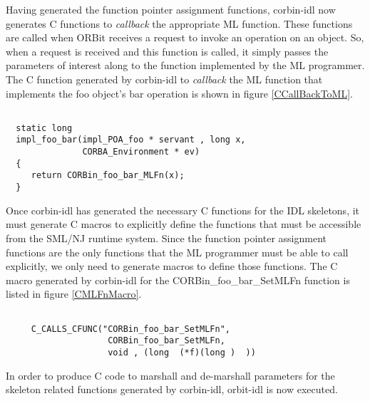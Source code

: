 Having generated the function pointer assignment functions, 
corbin-idl now generates C functions to {\em{callback}} the appropriate 
ML function.   
These functions are called when ORBit receives a request to invoke
an operation on an object.  So, when a request is received and this function 
is called, it simply passes the parameters of interest along to the function
implemented by the ML programmer.  The C function generated by corbin-idl 
to {\em{callback}} the ML function that implements the foo object's bar 
operation is shown in figure \ref{CCallBackToML}.
\begin{figure*}[t]
\singlespace
\begin{verbatim}

  static long
  impl_foo_bar(impl_POA_foo * servant , long x, 
               CORBA_Environment * ev)
  {
     return CORBin_foo_bar_MLFn(x);
  }

\end{verbatim}
\doublespace
\caption {\em{C function generated by corbin-idl that is called by ORBit when a client application invokes the bar operation on the foo object}.}
\figline
        \label{CCallBackToML}
\end{figure*}

Once corbin-idl has generated the necessary C functions for the IDL skeletons, 
it must generate C macros to explicitly define the functions that must be 
accessible from the SML/NJ runtime system.  Since the function pointer
assignment functions are the only functions that the ML programmer must be 
able to call explicitly, we only need to generate macros to define those 
functions.  The C macro generated by corbin-idl for the 
CORBin\_foo\_bar\_SetMLFn function is listed in figure \ref{CMLFnMacro}. 
\begin{figure*}[t]
\singlespace
\begin{verbatim}

     C_CALLS_CFUNC("CORBin_foo_bar_SetMLFn",
                    CORBin_foo_bar_SetMLFn, 
                    void , (long  (*f)(long )  ))

\end{verbatim}
\doublespace
\caption {\em{C Macro to explicitly define the CORBin\_foo\_bar\_SetMLFn function in the SML/NJ runtime system}.}
\figline
        \label{CMLFnMacro}
\end{figure*}
In order to produce C code to marshall and de-marshall parameters for the 
skeleton related functions generated by corbin-idl, orbit-idl is now executed. 

